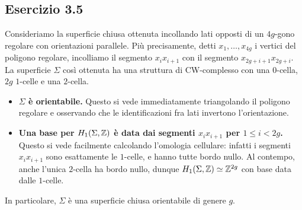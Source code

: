 \newpage
\subsection*{Esercizio 3.5}
\newcommand{\ngon}[3][0]{
\tikzmath{
\g = #2;
\r = #3;
\n = \g * 4;
\twog = \g * 2;
}
\foreach \i [evaluate=\i as \an using 180*((2*\i-1)/\n+1)] in {1,...,\n} {
    \tkzDefPoint(\an:\r){x_\i}
    \tikzmath{\an1 = \an + #1;}
    \tkzLabelPoint[label=\an1:$x_{\i}$,anchor=base](x_\i){}
}
\begin{scope}[on background layer]
\tkzFillPolygon[blue!10](x_1,x_...,x_\n)
\end{scope}
\foreach \i in {1,...,\twog} {
    \tikzmath{
        \j = \i + 1;
        \l = \twog + \i;
        \k = \l + 1;
        if \k > \n then {
            \k = 1;
        };
        if Mod(\i, 2) == 0 then {
            let \col = white;
        } else {
            let \col = black;
        };
        \s = .15 * 3 / (\r * 5.1 * sin(180 / \n));
        \t = (\i + Mod(\i, 2) - 2) / 2;
    }
    \foreach \b/\e in {\i/\j,\k/\l} {
        \tkzDrawSegment[postaction={decorate},decoration={markings,mark=between positions (0.5+\s*0.75-\s/2*\t) and (0.51+\s*0.75+\s/2*\t) step \s with {\arrow[scale=1.2,\col]{Triangle}\arrow[scale=1.2,black]{Triangle[open]}}}](x_\b,x_\e)
    }
}
\tkzDrawPoints(x_1,x_...,x_\n)
}

Consideriamo la superficie chiusa ottenuta incollando lati opposti di un $4g$-gono regolare con orientazioni parallele. Più precisamente, detti $x_1,\ldots,x_{4g}$ i vertici del poligono regolare, incolliamo il segmento $x_ix_{i+1}$ con il segmento $x_{2g+i+1}x_{2g+i}$. La superficie $\Sigma$ così ottenuta ha una struttura di CW-complesso con una $0$-cella, $2g$ $1$-celle e una $2$-cella.
\begin{center}
\end{center}
\begin{itemize}
\item\textbf{$\Sigma$ è orientabile.} Questo si vede immediatamente triangolando il poligono regolare e osservando che le identificazioni fra lati invertono l'orientazione.
\item\textbf{Una base per $H_1(\Sigma,\mathbb{Z})$ è data dai segmenti $x_ix_{i+1}$ per $1\le i<2g$.} Questo si vede facilmente calcolando l'omologia cellulare: infatti i segmenti $x_ix_{i+1}$ sono esattamente le $1$-celle, e hanno tutte bordo nullo. Al contempo, anche l'unica $2$-cella ha bordo nullo, dunque $H_1(\Sigma,\mathbb{Z})\simeq\mathbb{Z}^{2g}$ con base data dalle $1$-celle.
\end{itemize}
In particolare, $\Sigma$ è una superficie chiusa orientabile di genere $g$.

